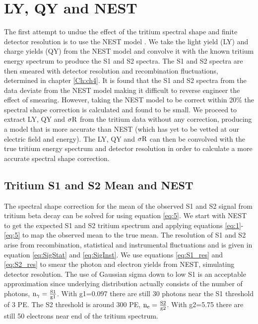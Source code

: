 \section{LY, QY and NEST}

The first attempt to undue the effect of the tritium spectral shape and finite detector resolution is to use the NEST model \cite{NEST_2013}. We take the light yield (LY) and charge yields (QY) from the NEST model and convolve it with the known tritium energy spectrum to produce the S1 and S2 spectra. The S1 and S2 spectra are then smeared with detector resolution and recombination fluctuations, determined in chapter \ref{Ch:ch4}. It is found  that the S1 and S2 spectra from the data deviate from the NEST model making it difficult to reverse engineer the effect of smearing. However, taking the NEST model to be correct within 20\% the spectral shape correction is calculated and found to be small. We proceed to extract LY, QY and $\rm \sigma R$ from the tritium data without any correction, producing a model that is more accurate than NEST (which has yet to be vetted at our electric field and energy). The LY, QY and  $\rm \sigma R$ can then be convolved with the true tritium energy spectrum and detector resolution in order to calculate a more accurate spectral shape correction.



\subsection{Tritium S1 and S2 Mean and NEST}

The spectral shape correction for the mean of the observed S1 and S2 signal from tritium beta decay can be solved for using equation \ref{eq:5}. We start with NEST to get the expected S1 and S2 tritium spectrum and applying equations \ref{eq:1}-\ref{eq:5} to map the observed mean to the true mean. The resolution of S1 and S2 arise from recombination, statistical and instrumental fluctuations and is given in equation \ref{eq:SigStat} and \ref{eq:SigInst}. We use equations \ref{eq:S1_res} and \ref{eq:S2_res} to smear the photon and electron yields from NEST, simulating detector resolution. The use of Gaussian sigma down to low S1 is an acceptable approximation since underlying distribution actually consists of the number of photons, $\rm n_\gamma = \frac{S1}{g1}$. With g1=0.097 there are still 30 photons near the S1 threshold of 3 PE. The S2 threshold is around 300 PE, $\rm n_e = \frac{S2}{g2}$. With g2=5.75 there are still 50 electrons near end of the tritium spectrum.

